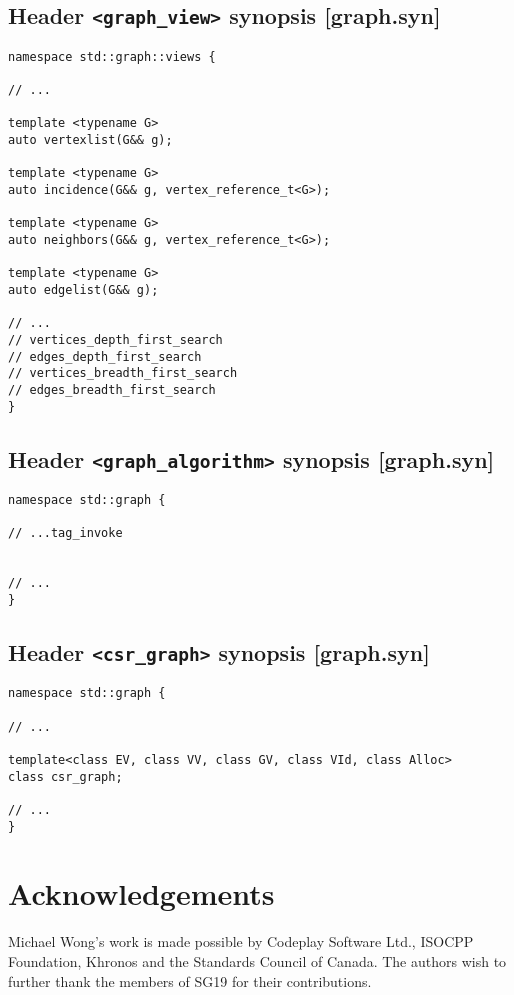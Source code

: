 \documentclass[10pt,onecolumn]{article}
\newcommand{\tcode}[1]{\lstinline[breaklines=true]{#1}}
\begin{document}
\subsection{Header \tcode{<graph_view>} synopsis [graph.syn]}

\begin{lstlisting}
namespace std::graph::views {

// ...

template <typename G>
auto vertexlist(G&& g);

template <typename G>
auto incidence(G&& g, vertex_reference_t<G>);

template <typename G>
auto neighbors(G&& g, vertex_reference_t<G>);

template <typename G>
auto edgelist(G&& g);

// ...
// vertices_depth_first_search
// edges_depth_first_search
// vertices_breadth_first_search
// edges_breadth_first_search
}
\end{lstlisting}

\subsection{Header \tcode{<graph_algorithm>} synopsis [graph.syn]}

\begin{lstlisting}
namespace std::graph {

// ...tag_invoke


// ...
}
\end{lstlisting}

\subsection{Header \tcode{<csr_graph>} synopsis [graph.syn]}

\begin{lstlisting}
namespace std::graph {

// ...

template<class EV, class VV, class GV, class VId, class Alloc>
class csr_graph;

// ...
}
\end{lstlisting}


\section{Acknowledgements}
Michael Wong's work is made possible by Codeplay Software Ltd., ISOCPP Foundation, Khronos and the Standards Council of Canada.  The authors wish to further thank the members of SG19 for their contributions.

\footnotesize


\normalsize
\end{document}
